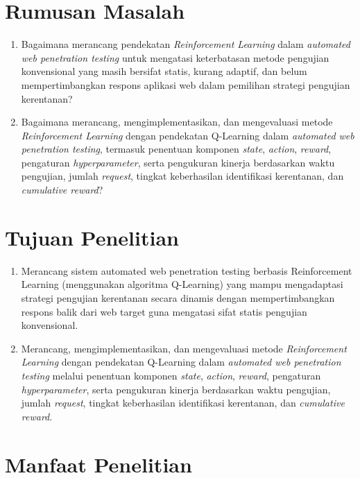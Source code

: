 \section{Rumusan Masalah}
\begin{enumerate}
    \item Bagaimana merancang pendekatan \textit{Reinforcement Learning} dalam \textit{automated web penetration testing} untuk mengatasi keterbatasan metode pengujian konvensional yang masih bersifat statis, kurang adaptif, dan belum mempertimbangkan respons aplikasi web dalam pemilihan strategi pengujian kerentanan?
    
    \item Bagaimana merancang, mengimplementasikan, dan mengevaluasi metode \textit{Reinforcement Learning} dengan pendekatan Q-Learning dalam \textit{automated web penetration testing}, termasuk penentuan komponen \textit{state}, \textit{action}, \textit{reward}, pengaturan \textit{hyperparameter}, serta pengukuran kinerja berdasarkan waktu pengujian, jumlah \textit{request}, tingkat keberhasilan identifikasi kerentanan, dan \textit{cumulative reward}?
\end{enumerate}

\section{Tujuan Penelitian}
\begin{enumerate}
    \item Merancang sistem automated web penetration testing berbasis Reinforcement Learning (menggunakan algoritma Q-Learning) yang mampu mengadaptasi strategi pengujian kerentanan secara dinamis dengan mempertimbangkan respons balik dari web target guna mengatasi sifat statis pengujian konvensional.
    
    \item Merancang, mengimplementasikan, dan mengevaluasi metode \textit{Reinforcement Learning} dengan pendekatan Q-Learning dalam \textit{automated web penetration testing} melalui penentuan komponen \textit{state}, \textit{action}, \textit{reward}, pengaturan \textit{hyperparameter}, serta pengukuran kinerja berdasarkan waktu pengujian, jumlah \textit{request}, tingkat keberhasilan identifikasi kerentanan, dan \textit{cumulative reward}.
\end{enumerate}

\section{Manfaat Penelitian}

